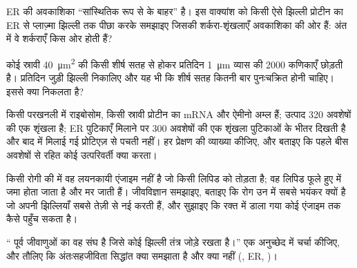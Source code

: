 \begin{exercise}[$\star\star$]\label{exo:b1:eukaryotic-cell:8}
ER की अवकाशिका ``सांस्थितिक रूप से  के बाहर'' है। इस वाक्यांश को
किसी ऐसे झिल्ली प्रोटीन का ER से प्लाज़्मा झिल्ली तक पीछा करके समझाइए
जिसकी शर्करा-शृंखलाएँ अवकाशिका की ओर हैं: अंत में वे शर्कराएँ किस ओर
होती हैं?
\end{exercise}

\begin{exercise}[$\star\star$]\label{exo:b1:eukaryotic-cell:9}
कोई स्रावी  \qty{40}{\micro m^2} की किसी शीर्ष सतह से होकर
प्रतिदिन \qty{1}{\micro m} व्यास की \qty{2000}{} कणिकाएँ छोड़ती है।
प्रतिदिन जुड़ी झिल्ली निकालिए और यह भी कि शीर्ष सतह कितनी बार पुनःचक्रित
होनी चाहिए। इससे क्या निकलता है?
\end{exercise}

\begin{exercise}[$\star\star\star$]\label{exo:b1:eukaryotic-cell:10}
किसी परखनली में राइबोसोम, किसी स्रावी प्रोटीन का mRNA और ऐमीनो अम्ल हैं;
उत्पाद \qty{320}{} अवशेषों की एक शृंखला है; ER पुटिकाएँ मिलाने पर
\qty{300}{} अवशेषों की एक शृंखला पुटिकाओं के भीतर दिखती है और बाद में
मिलाई गई प्रोटिएज़ से पचती नहीं। हर प्रेक्षण की व्याख्या कीजिए, और
बताइए कि पहले बीस अवशेषों से रहित कोई उत्परिवर्ती क्या करता।
\end{exercise}

\begin{exercise}[$\star\star\star$]\label{exo:b1:eukaryotic-cell:11}
किसी रोगी की  में वह लयनकायी एंजाइम नहीं है जो किसी लिपिड को
तोड़ता है; वह लिपिड फूले हुए  में जमा होता जाता है और 
मर जाती हैं।  जीवविज्ञान समझाइए, बताइए कि रोग उन  में सबसे
भयंकर क्यों है जो अपनी झिल्लियाँ सबसे तेज़ी से नई करती हैं, और सुझाइए कि
रक्त में डाला गया कोई एंजाइम  तक कैसे पहुँच सकता है।
\end{exercise}

\begin{exercise}[$\star\star\star$]\label{exo:b1:eukaryotic-cell:12}
`` पूर्व जीवाणुओं का वह संघ है जिसे कोई झिल्ली तंत्र
जोड़े रखता है।'' एक अनुच्छेद में चर्चा कीजिए, और तौलिए कि अंतःसहजीविता
सिद्धांत क्या समझाता है और क्या नहीं (, ER, )।
\end{exercise}

